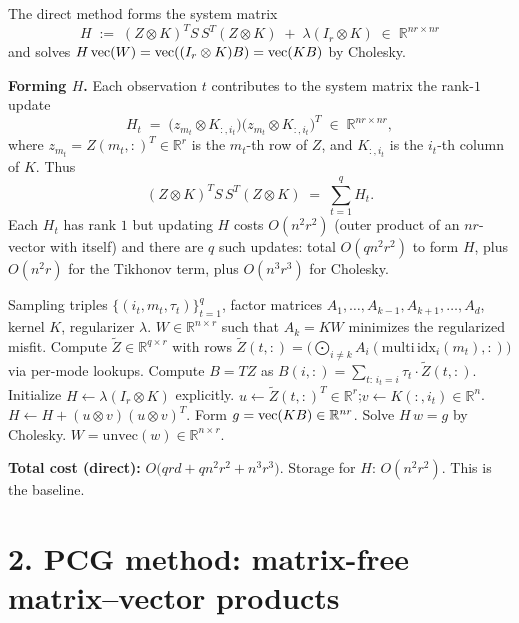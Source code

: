 The direct method forms the system matrix
\[
H \;:=\; (Z\otimes K)^T S\,S^T(Z\otimes K) \;+\;\lambda(I_r\otimes K)\;\in\;\mathbb R^{nr\times nr}
\]
and solves $H\operatorname{vec}(W)=\operatorname{vec}((I_r\otimes K)B)=\operatorname{vec}(KB)$ by Cholesky.

\medskip
\noindent\textbf{Forming $H$.}  Each observation $t$ contributes to the system matrix the rank-$1$ update
\[
H_t \;=\;\bigl(z_{m_t}\otimes K_{:,i_t}\bigr)\bigl(z_{m_t}\otimes K_{:,i_t}\bigr)^T \;\in\;\mathbb R^{nr\times nr},
\]
where $z_{m_t}=Z(m_t,:)^T\in\mathbb R^r$ is the $m_t$-th row of $Z$, and $K_{:,i_t}$ is the $i_t$-th column of $K$.  Thus
\[
(Z\otimes K)^T S\,S^T(Z\otimes K)\;=\;\sum_{t=1}^q H_t.
\]
Each $H_t$ has rank $1$ but updating $H$ costs $O(n^2 r^2)$ (outer product of an $nr$-vector with itself) and there are $q$ such updates: total $O(qn^2r^2)$ to form $H$, plus $O(n^2r)$ for the Tikhonov term, plus $O(n^3r^3)$ for Cholesky.

\medskip

\begin{algorithm}[H]
\caption{Direct symmetric solve for the RKHS mode-$k$ subproblem}
\begin{algorithmic}[1]
\Require Sampling triples $\{(i_t,m_t,\tau_t)\}_{t=1}^q$, factor matrices $A_1,\ldots,A_{k-1},A_{k+1},\ldots,A_d$, kernel $K$, regularizer $\lambda$.
\Ensure $W\in\mathbb R^{n\times r}$ such that $A_k=KW$ minimizes the regularized misfit.
\State Compute $\widetilde Z\in\mathbb R^{q\times r}$ with rows $\widetilde Z(t,:)=\bigl(\bigodot_{i\ne k} A_i(\mathrm{multi\,idx}_i(m_t),:)\bigr)$ via per-mode lookups. 
\State Compute $B=T Z$ as $B(i,:)=\sum_{t:\,i_t=i}\tau_t\cdot\widetilde Z(t,:)$. 
\State Initialize $H\gets \lambda(I_r\otimes K)$ explicitly. 
  \State $u\gets \widetilde Z(t,:)^T\in\mathbb R^r$;\quad $v\gets K(:,i_t)\in\mathbb R^n$.
  \State $H \gets H + (u\otimes v)(u\otimes v)^T$. 
\EndFor
\State Form $g=\operatorname{vec}(KB)\in\mathbb R^{nr}$. 
\State Solve $H\,w=g$ by Cholesky. 
\State \Return $W=\mathrm{unvec}(w)\in\mathbb R^{n\times r}$.
\end{algorithmic}
\end{algorithm}

\noindent\textbf{Total cost (direct):} $O\bigl(qrd + qn^2r^2 + n^3r^3\bigr)$.  Storage for $H$: $O(n^2r^2)$.  This is the baseline.

\section*{2. PCG method: matrix-free matrix--vector products}

